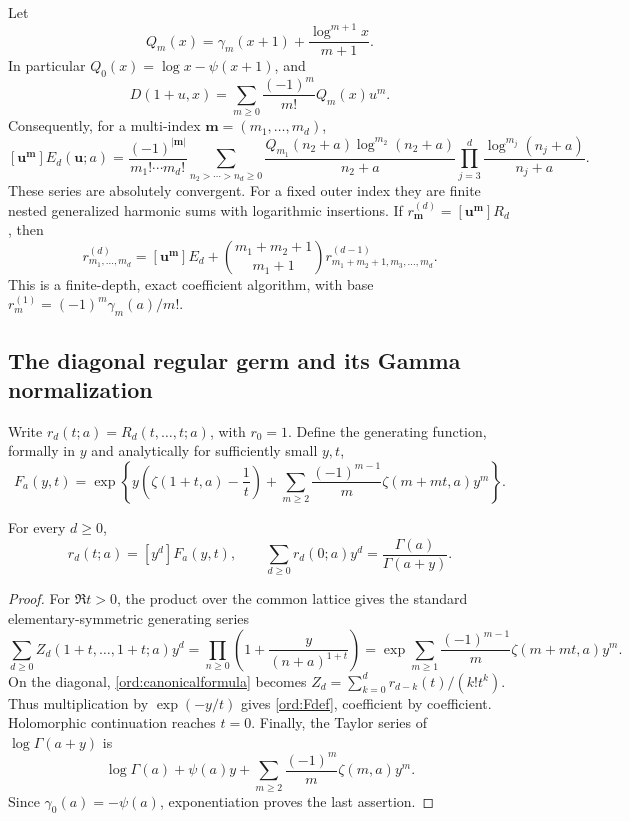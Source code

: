 Let
\[
 Q_m(x)=\gamma_m(x+1)+\frac{\log^{m+1}x}{m+1}.
\]
In particular $Q_0(x)=\log x-\psi(x+1)$, and
\[
 D(1+u,x)=\sum_{m\ge0}\frac{(-1)^m}{m!}Q_m(x)u^m.
\]
Consequently, for a multi-index $\mathbf m=(m_1,\ldots,m_d)$,
\begin{equation}\label{ord:Ecoeff}
 [\mathbf u^{\mathbf m}]E_d(\mathbf u;a)
 =\frac{(-1)^{|\mathbf m|}}{m_1!\cdots m_d!}
 \sum_{n_2>\cdots>n_d\ge0}
 \frac{Q_{m_1}(n_2+a)\log^{m_2}(n_2+a)}{n_2+a}
 \prod_{j=3}^d\frac{\log^{m_j}(n_j+a)}{n_j+a}.
\end{equation}
These series are absolutely convergent. For a fixed outer index they
are finite nested generalized harmonic sums with logarithmic insertions.
If $r^{(d)}_{\mathbf m}=[\mathbf u^{\mathbf m}]R_d$, then
\begin{equation}\label{ord:Rcoeffrec}
 r^{(d)}_{m_1,\ldots,m_d}
 =[\mathbf u^{\mathbf m}]E_d
 +\binom{m_1+m_2+1}{m_1+1}
 r^{(d-1)}_{m_1+m_2+1,m_3,\ldots,m_d}.
\end{equation}
This is a finite-depth, exact coefficient algorithm, with base
$r^{(1)}_m=(-1)^m\gamma_m(a)/m!$.

\subsection{The diagonal regular germ and its Gamma normalization}

Write $r_d(t;a)=R_d(t,\ldots,t;a)$, with $r_0=1$.
Define the generating function, formally in $y$ and analytically for
sufficiently small $y,t$,
\begin{equation}\label{ord:Fdef}
 F_a(y,t)=\exp\left\{
 y\left(\zeta(1+t,a)-\frac1t\right)
 +\sum_{m\ge2}\frac{(-1)^{m-1}}m
                   \zeta(m+mt,a)y^m\right\}.
\end{equation}

\begin{theorem}
\label{ord:diag}
For every $d\ge0$,
\begin{equation}\label{ord:diagformula}
 r_d(t;a)=[y^d]F_a(y,t),\qquad
 \sum_{d\ge0}r_d(0;a)y^d=\frac{\Gamma(a)}{\Gamma(a+y)}.
\end{equation}
\end{theorem}

\begin{proof}
For $\Re t>0$, the product over the common lattice gives the standard
elementary-symmetric generating series
\[
 \sum_{d\ge0}Z_d(1+t,\ldots,1+t;a)y^d
 =\prod_{n\ge0}\left(1+\frac{y}{(n+a)^{1+t}}\right)
 =\exp\sum_{m\ge1}\frac{(-1)^{m-1}}m\zeta(m+mt,a)y^m.
\]
On the diagonal, \eqref{ord:canonicalformula} becomes
$Z_d=\sum_{k=0}^dr_{d-k}(t)/(k!t^k)$.
Thus multiplication by $\exp(-y/t)$ gives \eqref{ord:Fdef},
coefficient by coefficient. Holomorphic continuation reaches $t=0$.
Finally, the Taylor series of $\log\Gamma(a+y)$ is
\[
 \log\Gamma(a)+\psi(a)y
       +\sum_{m\ge2}\frac{(-1)^m}{m}\zeta(m,a)y^m.
\]
Since $\gamma_0(a)=-\psi(a)$, exponentiation proves the last assertion.
\end{proof}

